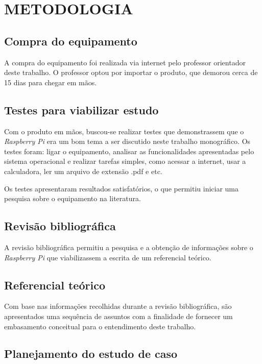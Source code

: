 \chapter{METODOLOGIA}

\section{Compra do equipamento}

A compra do equipamento foi realizada via internet pelo professor orientador deste trabalho. O professor optou por importar o produto, que demorou cerca de 15 dias para chegar em mãos.

\section{Testes para viabilizar estudo}

Com o produto em mãos, buscou-se realizar testes que demonstrassem que o \textit{Raspberry Pi} era um bom tema a ser discutido neste trabalho monográfico. Os testes foram: ligar o equipamento, analisar as funcionalidades apresentadas pelo sistema operacional e realizar tarefas simples, como acessar a internet, usar a calculadora, ler um arquivo de extensão .pdf e etc.

Os testes apresentaram resultados satisfatórios, o que permitiu iniciar uma pesquisa sobre o equipamento na literatura.

\section{Revisão bibliográfica}

A revisão bibliográfica permitiu a pesquisa e a obtenção de informações sobre o \textit{Raspberry Pi} que viabilizassem a escrita de um referencial teórico.

\section{Referencial teórico}

Com base nas informações recolhidas durante a revisão bibliográfica, são apresentados uma sequência de assuntos com a finalidade de fornecer um embasamento conceitual para o entendimento deste trabalho.

\section{Planejamento do estudo de caso}

